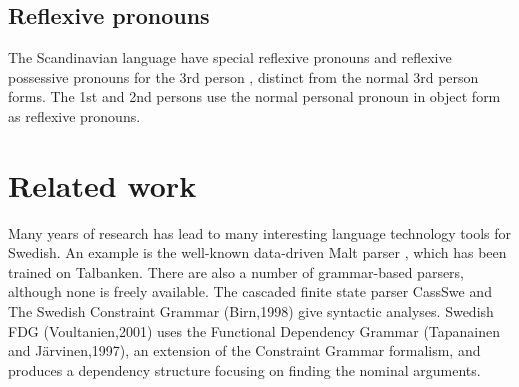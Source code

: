 \documentclass{report}
\begin{document}
\subsection*{Reflexive pronouns}
\label{swe:refl}
The Scandinavian language have special reflexive pronouns
and reflexive possessive pronouns for the 3rd
person \cite[ \& 319]{H&H}, distinct from the normal 3rd person forms.
The 1st and 2nd persons use the normal personal pronoun in object form as reflexive
pronouns.



\section{Related work}
\label{sec:related}
Many years of research has lead to many interesting language
technology tools for Swedish.
An example is the well-known data-driven Malt parser \cite{malt},
which has been trained on Talbanken. 
There are also a number of grammar-based parsers, although none is freely available.
The cascaded finite state parser CassSwe \cite{casswe} and
The Swedish Constraint Grammar (Birn,1998) 
give syntactic analyses. %
Swedish FDG (Voultanien,2001) uses the Functional Dependency Grammar
(Tapanainen and Järvinen,1997), an extension of the Constraint Grammar
formalism, and produces a dependency structure focusing on finding the nominal
arguments. \\
\end{document}

